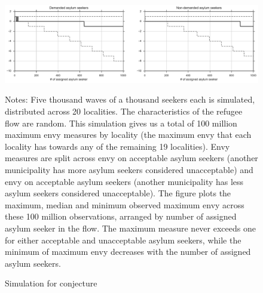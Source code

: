 \documentclass[12pt,fleqn]{article}
\begin{document}
\begin{figure}

	\caption{Simulation for conjecture}
	\begin{center}
		\includegraphics[width=\linewidth]{figs/conjecture/both.pdf}
	\end{center}
		{\scriptsize \vspace{-1em}
	\begin{singlespace}
		{\sc Notes:} Five thousand waves of a thousand seekers each is simulated, distributed across 20 localities. The characteristics of the refugee flow are random. This simulation gives us a total of 100 million maximum envy measures by locality (the maximum envy that each locality has towards any of the remaining 19 localities). Envy measures are split across envy on acceptable asylum seekers (another municipality has more asylum seekers considered unacceptable) and envy on acceptable asylum seekers (another municipality has less asylum seekers considered unacceptable). The figure plots the maximum, median and minimum observed maximum envy across these 100 million observations, arranged by number of assigned asylum seeker in the flow. The maximum measure never exceeds one for either acceptable and unacceptable asylum seekers, while the minimum of maximum envy decreases with the number of assigned asylum seekers.
	\end{singlespace}
	 }
\end{figure}
\end{document}
